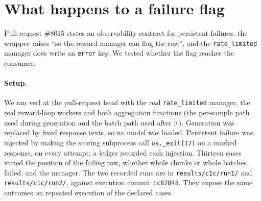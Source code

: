 \documentclass[10pt,a4paper]{article}
\begin{document}
\section{What happens to a failure flag}
\label{sec:mechanism}

Pull request \#8015 states an observability contract for persistent
failures: the wrapper raises ``so the reward manager can flag the row'', and
the \texttt{rate\_limited} manager does write an \texttt{error} key. We tested
whether the flag reaches the consumer.

\paragraph{Setup.}
We ran verl at the pull-request head with the real \texttt{rate\_limited}
manager, the real reward-loop workers and both aggregation functions (the
per-sample path used during generation and the batch path used after it).
Generation was replaced by fixed response texts, so no model was loaded.
Persistent failure was injected by making the scoring subprocess call
\texttt{os.\_exit(17)} on a marked response, on every attempt; a ledger
recorded each injection. Thirteen cases varied the position of the failing
row, whether whole chunks or whole batches failed, and the manager.
The two recorded runs are in \texttt{results/c1c/run1/} and
\texttt{results/c1c/run2/}, against execution commit \texttt{cc87848}.
They expose the same outcomes on repeated execution of the declared cases.
\end{document}
